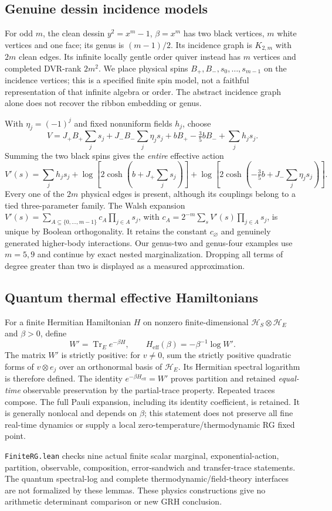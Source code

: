 \subsection{Genuine dessin incidence models}
For odd $ m $, the clean dessin $ y^2=x^m-1$, $\beta=x^m $ has two black
vertices, $ m $ white vertices and one face; its genus is $(m-1)/2$.
Its incidence graph is $ K_{2,m}$ with $2 m $ clean edges. Its infinite
locally gentle order quiver instead has $ m $ vertices and completed
DVR-rank $2 m^2$. We place physical spins $ B_+,B_-,s_0,\ldots,s_{m-1}$
on the incidence vertices; this is a specified finite spin model, not a
faithful representation of that infinite algebra or order. The abstract
incidence graph alone does not recover the ribbon embedding or genus.

With $\eta_j=(-1)^j $ and fixed nonuniform fields $ h_j $, choose
\[
 V=J_+B_+\sum_js_j+J_-B_-\sum_j\eta_js_j
       +bB_+-\tfrac 35 bB_-+\sum_jh_js_j.
\]
Summing the two black spins gives the \emph{entire} effective action
\[
 V'(s)=\sum_jh_js_j+
 \log\!\left[2\cosh\!\left(b+J_+\sum_js_j\right)\right]+
 \log\!\left[2\cosh\!\left(-\tfrac 35 b+J_-\sum_j\eta_js_j\right)\right].
\]
Every one of the $2 m $ physical edges is present, although its couplings
belong to a tied three-parameter family. The Walsh expansion
$ V'(s)=\sum_{A\subseteq\{0,\ldots,m-1\}}c_A\prod_{j\in A}s_j $,
with $ c_A=2^{-m}\sum_sV'(s)\prod_{j\in A}s_j $, is unique by Boolean
orthogonality. It retains the constant $ c_\varnothing $ and genuinely
generated higher-body interactions. Our genus-two and genus-four examples
use $ m=5,9$ and continue by exact nested marginalization. Dropping all terms
of degree greater than two is displayed as a measured approximation.

\subsection{Quantum thermal effective Hamiltonians}
For a finite Hermitian Hamiltonian $ H $ on nonzero finite-dimensional
$\mathcal H_S\otimes\mathcal H_E $
and $\beta>0$, define
\[
 W'=\operatorname{Tr}_E e^{-\beta H},\qquad
 H_{\mathrm{eff}}(\beta)=-\beta^{-1}\log W'.
\]
The matrix $ W'$ is strictly positive: for $ v\ne 0$, sum the strictly
positive quadratic forms of $ v\otimes e_j $ over an orthonormal basis of
$\mathcal H_E $. Its Hermitian spectral logarithm is therefore defined.
The identity $ e^{-\beta H_{\mathrm{eff}}}=W'$ proves partition and retained
\emph{equal-time} observable preservation by the partial-trace property.
Repeated traces compose. The full Pauli expansion, including its identity
coefficient, is retained. It is generally nonlocal and depends on $\beta $;
this statement does not preserve all fine real-time dynamics or supply a
local zero-temperature/thermodynamic RG fixed point.

\texttt{FiniteRG.lean} checks nine actual finite scalar marginal,
exponential-action, partition, observable, composition, error-sandwich and
transfer-trace statements. The quantum spectral-log and complete
thermodynamic/field-theory interfaces are not formalized by these lemmas.
These physics constructions give no arithmetic determinant comparison or
new GRH conclusion.
